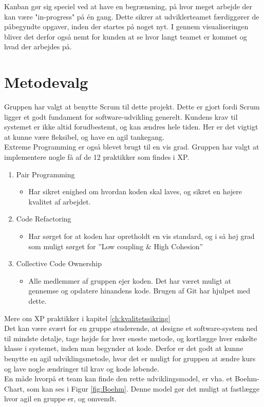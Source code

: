 Kanban gør sig speciel ved at have en begrænsning, på hvor meget arbejde der kan være "in-progress" på én gang. 
Dette sikrer at udviklerteamet færdiggører de påbegyndte opgaver, inden der startes på noget nyt. 
I gennem visualiseringen bliver det derfor også nemt for kunden at se hvor langt teamet er kommet og
hvad der arbejdes på.

\section{Metodevalg}\label{sec:valgafvaektoej}
Gruppen har valgt at benytte Scrum til dette projekt. Dette er gjort fordi Scrum ligger et godt fundament 
for software-udvikling generelt. Kundens krav til systemet er ikke altid forudbestemt, og kan ændres hele tiden. 
Her er det vigtigt at kunne være fleksibel, og have en agil tankegang. \\
Extreme Programming er også blevet brugt til en vis grad. Gruppen har valgt at implementere nogle få 
af de 12 praktikker som findes i XP. 
\begin{enumerate}
    \item Pair Programming
    \begin{itemize}
        \item Har sikret enighed om hvordan koden skal laves, og sikret en højere kvalitet af arbejdet.
    \end{itemize}

    \item Code Refactoring
    \begin{itemize}
        \item Har sørget for at koden har opretholdt en vis standard, og i så høj grad som muligt sørget for ”Low coupling \& High Cohesion”
    \end{itemize}
    
    \item Collective Code Ownership
    \begin{itemize}
        \item Alle medlemmer af gruppen ejer koden. Det har været muligt at gennemse og opdatere hinandens kode. 
        Brugen af Git har hjulpet med dette. 
    \end{itemize}
\end{enumerate}

Mere om XP praktikker i kapitel \ref{ch:kvalitetssikring}\\

Det kan være svært for en gruppe studerende, at designe et software-system ned til mindste detalje, 
tage højde for hver eneste metode, og kortlægge hver enkelte klasse i systemet, inden man begynder at kode. 
Derfor er det godt at kunne benytte en agil udviklingsmetode, hvor det er muligt for gruppen at ændre kurs og 
lave nogle ændringer til krav og kode løbende. \\
En måde hvorpå et team kan finde den rette udviklingsmodel, er vha. et Boehm-Chart, som kan ses i Figur \ref{fig:Boehm}. 
Denne model gør det muligt at fastlægge hvor agil en gruppe er, og omvendt. \\

